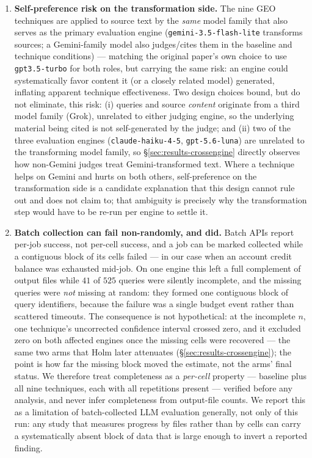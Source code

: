 \documentclass[11pt,a4paper]{article}
\begin{document}
\begin{enumerate}[leftmargin=*]
\item \textbf{Self-preference risk on the transformation side.} The nine
  GEO techniques are applied to source text by the \emph{same} model
  family that also serves as the primary evaluation engine
  (\texttt{gemini-3.5-flash-lite} transforms sources; a Gemini-family model
  also judges/cites them in the baseline and technique conditions) ---
  matching the original paper's own choice to use \texttt{gpt3.5-turbo} for
  both roles, but carrying the same risk: an engine could systematically
  favor content it (or a closely related model) generated, inflating
  apparent technique effectiveness. Two design choices bound, but do not
  eliminate, this risk: (i) queries and source \emph{content} originate
  from a third model family (Grok), unrelated to either judging engine, so
  the underlying material being cited is not self-generated by the judge;
  and (ii) two of the three evaluation engines
  (\texttt{claude-haiku-4-5}, \texttt{gpt-5.6-luna}) are unrelated to the
  transforming model family, so \S\ref{sec:results-crossengine} directly
  observes how non-Gemini judges treat Gemini-transformed text. Where a
  technique helps on Gemini and hurts on both others, self-preference on
  the transformation side is a candidate explanation that this design
  cannot rule out and does not claim to; that ambiguity is precisely why
  the transformation step would have to be re-run per engine to settle it.

\item \textbf{Batch collection can fail non-randomly, and did.} Batch APIs
  report per-job success, not per-cell success, and a job can be marked
  collected while a contiguous block of its cells failed --- in our case
  when an account credit balance was exhausted mid-job. On one engine this
  left a full complement of output files while $41$ of $525$ queries were
  silently incomplete, and the missing queries were \emph{not} missing at
  random: they formed one contiguous block of query identifiers, because
  the failure was a single budget event rather than scattered timeouts.
  The consequence is not hypothetical: at the incomplete $n$, one
  technique's uncorrected confidence interval crossed zero, and it excluded
  zero on both affected engines once the missing cells were recovered ---
  the same two arms that Holm later attenuates
  (\S\ref{sec:results-crossengine}); the point is how far the missing block
  moved the estimate, not the arms' final status. We
  therefore treat completeness as a \emph{per-cell} property --- baseline
  plus all nine techniques, each with all repetitions present --- verified
  before any analysis, and never infer completeness from output-file
  counts. We report this as a limitation of batch-collected LLM evaluation
  generally, not only of this run: any study that measures progress by
  files rather than by cells can carry a systematically absent block of
  data that is large enough to invert a reported finding.


\end{enumerate}
\end{document}
